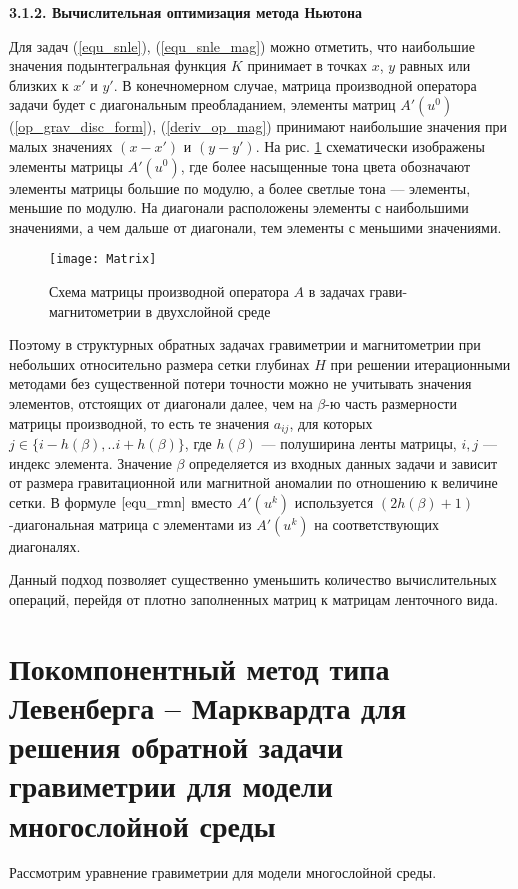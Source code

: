 \smallskip
{\bfseries 3.1.2. Вычислительная оптимизация метода Ньютона}

Для задач (\ref{equ_snle}), (\ref{equ_snle_mag}) можно отметить, что наибольшие значения подынтегральная функция $K$ принимает в точках $x$, $y$ равных или близких к $x'$ и $y'$. В конечномерном случае, матрица производной оператора задачи будет с диагональным преобладанием, элементы матриц $A'(u^0)$ (\ref{op_grav_disc_form}), (\ref{deriv_op_mag}) принимают наибольшие значения при малых значениях $(x-x')$ и $(y-y')$. На рис. \ref{fig:matrixscheme} схематически изображены элементы матрицы $A'(u^0)$, где более насыщенные тона цвета обозначают элементы матрицы большие по модулю, а более светлые тона --- элементы, меньшие по модулю. На диагонали расположены элементы с наибольшими значениями, а чем дальше от диагонали, тем элементы с меньшими значениями. 

\begin{figure}[H]
	\centering
	\texttt{[image: Matrix]}
	\caption{Схема матрицы производной оператора $A$ в задачах грави- магнитометрии в двухслойной среде}
	\label{fig:matrixscheme}
\end{figure}

Поэтому в структурных обратных задачах гравиметрии и магнитометрии при небольших относительно размера сетки глубинах $H$ при решении итерационными методами без существенной потери точности можно не учитывать значения элементов, отстоящих от диагонали далее, чем на  $\beta$-ю часть  размерности матрицы производной, то есть те значения $a_{ij}$, для которых  $j \in \{i-h(\beta),..i+h(\beta)\} $, где $h(\beta)$ --- полуширина ленты матрицы, $i, j$ --- индекс элемента. Значение $\beta$ определяется из входных данных задачи и зависит от размера гравитационной или магнитной аномалии по отношению к величине сетки. В формуле $\eqref{equ_rmn}$ вместо $A'(u^k)$ используется $(2h(\beta)+1)$-диагональная матрица с элементами из $A'(u^k)$ на соответствующих диагоналях.

Данный подход позволяет существенно уменьшить количество вычислительных операций, перейдя от плотно заполненных матриц к матрицам ленточного вида.

\newpage
\section{Покомпонентный метод типа Левенберга -- Марквардта для решения обратной задачи гравиметрии для модели многослойной среды}

Рассмотрим уравнение гравиметрии для модели многослойной среды. 

